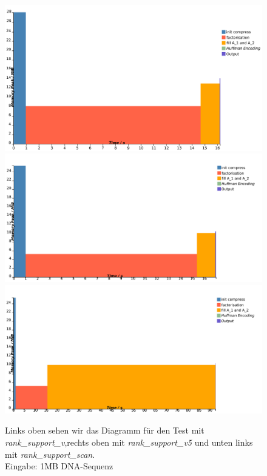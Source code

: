 \documentclass[a4paper,11pt]{scrartcl}%
\theoremstyle{change}
\theoremstyle{nonumberplain}
\theoremstyle{change}
\theoremstyle{nonumberplain}
\theoremstyle{change}
\theoremstyle{nonumberplain}
\begin{document}
\begin{figure}[h]
	\includegraphics[scale=0.27]{./pics/1MB_DNA_sct3}
	\includegraphics[scale=0.27]{./pics/1MB_DNA_v5}
	\includegraphics[scale=0.27]{./pics/1MB_DNA_scan}
	\caption{Links oben sehen wir das Diagramm für den Test mit \textit{rank\_support\_v},rechts oben mit \textit{rank\_support\_v5} und unten links mit \textit{rank\_support\_scan}.\\ Eingabe: 1MB DNA-Sequenz}
	\label{fig:rank_dna}
\end{figure}
\end{document}

